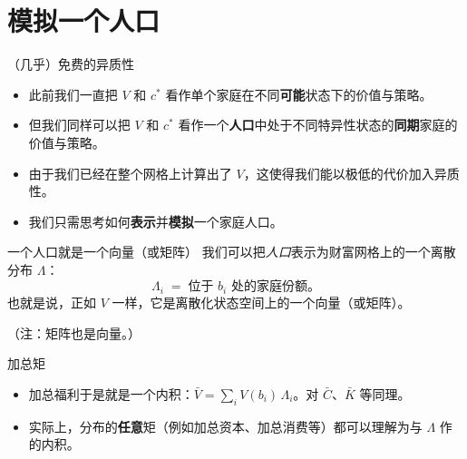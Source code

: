 \documentclass[10pt,aspectratio=169]{beamer}
\begin{document}
\section{模拟一个人口}

\begin{frame}{（几乎）免费的异质性}
  \begin{itemize}
    \item 此前我们一直把 $V$ 和 $c^*$ 看作单个家庭在不同\textbf{可能}状态下的价值与策略。
    \item 但我们同样可以把 $V$ 和 $c^*$ 看作一个\textbf{人口}中处于不同特异性状态的\textbf{同期}家庭的价值与策略。
    \item 由于我们已经在整个网格上计算出了 $V$，这使得我们能以极低的代价加入异质性。
    \item 我们只需思考如何\textbf{表示}并\textbf{模拟}一个家庭人口。
  \end{itemize}
\end{frame}

\begin{frame}{一个人口就是一个向量（或矩阵）}
  我们可以把\emph{人口}表示为财富网格上的一个离散分布 $\Lambda$：
  \[
    \Lambda_i \;=\; \text{位于 } b_i \text{ 处的家庭份额。}
  \]
  也就是说，正如 $V$ 一样，它是离散化状态空间上的一个向量（或矩阵）。

  （注：矩阵也是向量。）
\end{frame}

\begin{frame}{加总矩}
  \begin{itemize}
    \item 加总福利于是就是一个内积：$\bar{V} = \sum_i V(b_i) \, \Lambda_i$。对 $\bar{C}$、$\bar{K}$ 等同理。
    \item 实际上，分布的\textbf{任意}矩（例如加总资本、加总消费等）都可以理解为与 $\Lambda$ 作的内积。
  \end{itemize}
\end{frame}
\end{document}
